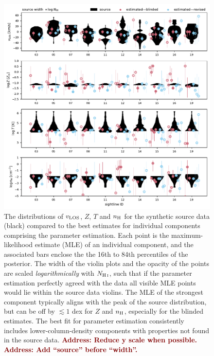 \documentclass[fleqn,usenatbib]{mnras}
\newcommand{\todo}[1]{\textcolor{Maroon}{\textbf{Address: #1}}}
\begin{document}
\begin{figure}
    \centering
    \includegraphics[width=\textwidth]{figures/sample2/violin_vs_components.pdf}
    \caption{
    The distributions of $v_{\rm LOS}$, $Z$, $T$ and $n_{\rm H}$ for the synthetic source data (black) compared to the best estimates for individual components comprising the parameter estimation.
    Each point is the maximum-likelihood estimate (MLE) of an individual component,
    and the associated bars enclose the the 16th to 84th percentiles of the posterior.
    The width of the violin plots and the opacity of the points are scaled \textit{logarithmically} with $N_{\ion{H}{I}}$,
    such that if the parameter estimation perfectly agreed with the data all visible MLE points would lie within the source data violins.
    The MLE of the strongest component typically aligns with the peak of the source distribution, but can be off by $\lesssim 1$ dex for $Z$ and $n_{\rm H}$, especially for the blinded estimates.
    The best fit for parameter estimation consistently includes lower-column-density components with properties not found in the source data.
    \todo{Reduce y scale when possible.}
    \todo{Add ``source'' before ``width''.}
    }
    \label{f: sample2 violin vs components}
\end{figure}
\end{document}
